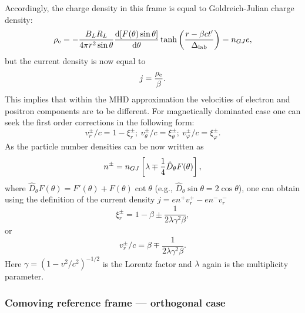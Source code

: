 \documentclass[useAMS,usenatbib]{mn2e}
\def\vph{\varphi}
\def\th{\theta}
\def\b{B_{L \rm} R_{L \rm}}
\def\td{\tanh\left(\frac{r-\beta c t'}{\Delta_{\rm lab}}\right)}
\begin{document}
Accordingly, the charge density in this frame is equal to Goldreich-Julian charge density:
\begin{equation}
\rho_{\rm e} = 
- \frac{\b}{4\pi r^2 \sin \theta} \frac{{\rm d}[F(\theta)\sin\theta]}{{\rm d}\theta} \td 
=  n_{GJ \rm} e,
\end{equation}
but the current density is now equal to
\begin{equation}
j = \frac{\rho_{\rm e}}{\beta}.
\end{equation}
This implies that within the MHD approximation the velocities of electron and positron
components are to be different. For magnetically dominated case one can seek the first 
order corrections in the following form:
\begin{equation}
v_r^\pm/c = 1 - \xi_r^\pm;~v_\th^\pm/c=\xi_\th^\pm;~v_\vph^\pm /c= \xi_\vph^\pm.
\end{equation}
As the particle number densities can be now written as
\begin{equation}
n^\pm = n_{GJ\rm} \left[\lambda \mp \frac{1}{4} {\hat D}_{\theta}F(\theta) \right],
\end{equation}
where ${\hat D}_{\theta}F(\theta)=F'(\theta) + F(\theta)\cot\theta$ 
(e.g., ${\hat D}_{\theta} \sin\theta = 2 \cos\theta$),
one can obtain using the definition of the current density 
\mbox{$j = e n^+ v_r^+ - e n^- v_r^-$}
\begin{equation}
\xi_r^\pm = 1-\beta \pm \frac{1}{2 \lambda \gamma^2 \beta},
\end{equation}
or
\begin{equation}
v_r^\pm/c = \beta \mp \frac{1}{2 \lambda \gamma^2 \beta}.
\end{equation}
Here $\gamma = (1-v^2/c^2)^{-1/2}$ is the Lorentz factor and $\lambda$ again is the
multiplicity parameter. 

\subsubsection{Comoving reference frame --- orthogonal case}
\label{sect:cmframe}
\end{document}
